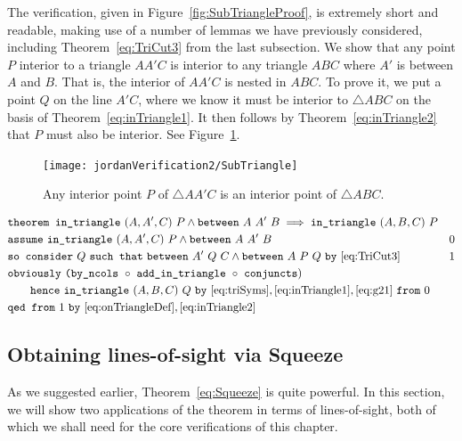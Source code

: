 The verification, given in Figure~\ref{fig:SubTriangleProof}, is extremely short and readable, making use of a number of lemmas we have previously considered, including Theorem~\ref{eq:TriCut3} from the last subsection. We show that any point $P$ interior to a triangle $AA'C$ is interior to any triangle $ABC$ where $A'$ is between $A$ and $B$. That is, the interior of $AA'C$ is nested in $ABC$. To prove it, we put a point $Q$ on the line $A'C$, where we know it must be interior to $\triangle ABC$ on the basis of Theorem~\ref{eq:inTriangle1}. It then follows by Theorem~\ref{eq:inTriangle2} that $P$ must also be interior. See Figure~\ref{fig:SubTriangle}.

\begin{figure}
\centering\texttt{[image: jordanVerification2/SubTriangle]}
\caption{Any interior point $P$ of $\triangle AA'C$ is an interior point of $\triangle ABC$.}
\label{fig:SubTriangle}
\end{figure}

\begin{boxedfigure}
\small
\begin{align*}
&\code{theorem }\code{in\_triangle}\ (A,A',C)\ P \wedge \between{A}{A'}{B} 
                  \implies \code{in\_triangle}\ (A,B,C)\ P\\
&\code{assume}\ \code{in\_triangle}\ (A,A',C)\ P \wedge \between{A}{A'}{B} & 0 \\
&\code{so consider}\ Q\ \code{such that}\ \between{A'}{Q}{C} \wedge \between{A}{P}{Q} \ \code{by}\ \eqref{eq:TriCut3} & 1\\
&\code{obviously}\ \code{(by\_ncols}\ \circ\ \code{add\_in\_triangle}\ \circ\ \code{conjuncts})\\
&\qquad \code{hence}\ \code{in\_triangle}\ (A,B,C)\ Q\ \code{by}\ \eqref{eq:triSyms},\eqref{eq:inTriangle1},\eqref{eq:g21}\ \code{from}\ 0\\
&\code{qed from}\ 1\ \code{by}\ \eqref{eq:onTriangleDef},\eqref{eq:inTriangle2}
\end{align*}
\caption{Subtriangles}
\label{fig:SubTriangleProof}
\end{boxedfigure}

\subsection{Obtaining lines-of-sight via Squeeze}\label{sec:SqueezeEye}
As we suggested earlier, Theorem~\ref{eq:Squeeze} is quite powerful. In this section, we will show two applications of the theorem in terms of lines-of-sight, both of which we shall need for the core verifications of this chapter. 

